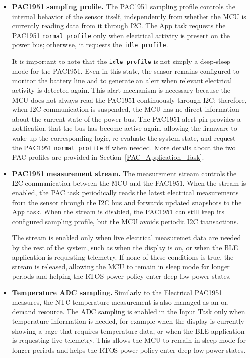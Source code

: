 \begin{itemize}
	\item \textbf{PAC1951 sampling profile.}
	The PAC1951 sampling profile controls the internal behavior of the sensor itself, independently from whether the MCU is currently reading data from it through I2C. The App task requests the PAC1951 \texttt{normal profile} only when electrical activity is present on the power bus; otherwise, it requests the \texttt{idle profile}.
	
	It is important to note that the \texttt{idle profile} is not simply a deep-sleep mode for the PAC1951. Even in this state, the sensor remains configured to monitor the battery line and to generate an alert when relevant electrical activity is detected again. This alert mechanism is necessary because the MCU does not always read the PAC1951 continuously through I2C; therefore, when I2C communication is suspended, the MCU has no direct information about the current state of the power bus. The PAC1951 alert pin provides a notification that the bus has become active again, allowing the firmware to wake up the corresponding logic, re-evaluate the system state, and request the PAC1951 \texttt{normal profile} if when needed. More details about the two PAC profiles are provided in Section~\ref{PAC_Application_Task}.
	
	
	\item \textbf{PAC1951 measurement stream.}
	The measurement stream controls the I2C communication between the MCU and the PAC1951. When the stream is enabled, the PAC task periodically reads the latest electrical measurements from the sensor through the I2C bus and forwards updated snapshots to the App task. When the stream is disabled, the PAC1951 can still keep its configured sampling profile, but the MCU avoids periodic I2C transactions.
	
	The stream is enabled only when live electrical measuremet data are needed by the rest of the system, such as when the display is on, or when the BLE application is requesting telemetry. If none of these conditions is true, the stream is released, allowing the MCU to remain in sleep mode for longer periods and helping the RTOS power policy enter deep low-power states.
	
	\item \textbf{Temperature ADC sampling.}
	Similarly to the Electrical PAC1951 measures, the NTC temperature measurement is also managed as an on-demand resource. The ADC sampling is enabled in the Input Task only when temperature information is needed, for example when the display is currently showing a page that requires temperature data, or when the BLE application is requesting live telemetry. This allows the MCU to remain in sleep mode for longer periods and helps the RTOS power policy enter deep low-power states.
	

\end{itemize}
